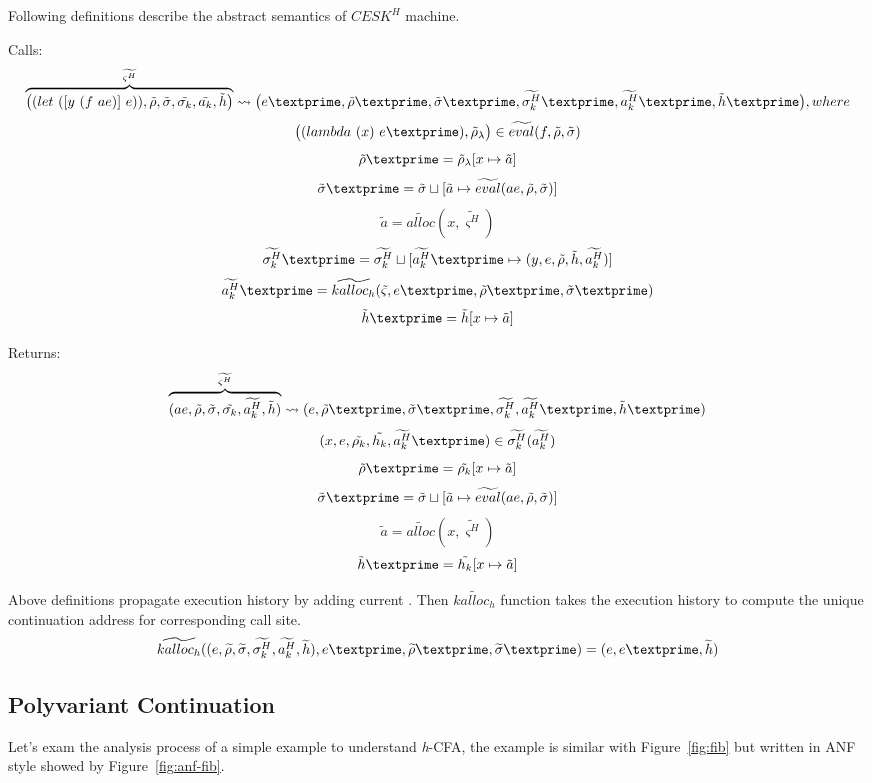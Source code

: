 \documentclass{article}
\begin{document}
Following definitions describe the abstract semantics of $CESK^H$ machine.

Calls:
\[
\overbrace{
\big((let\ ([y\ (f\ ae)]\ e)), \tilde{\rho}, \tilde{\sigma}, \tilde{\sigma_k}, \tilde{a_k}, \tilde{h} \big)
}^{\widetilde{\varsigma^H}}
\leadsto \big(e\textprime,\tilde{\rho}\textprime, \tilde{\sigma}\textprime, \widetilde{\sigma_k^H}\textprime, \widetilde{a_k^H}\textprime, \tilde{h}\textprime \big), where
\]
\[
\big((lambda\ (x)\ e\textprime), \tilde{\rho}_{\lambda}  \big) \in \widetilde{eval}(f, \tilde{\rho}, \tilde{\sigma})
\]
\[
\tilde{\rho}\textprime = \tilde{\rho}_{\lambda}[x \mapsto \tilde{a}]
\]
\[
\tilde{\sigma}\textprime = \tilde{\sigma} \sqcup [\tilde{a} \mapsto \widetilde{eval}(ae, \tilde{\rho}, \tilde{\sigma})]
\]
\[
\tilde{a} = \widetilde{alloc}(x, \widetilde{\varsigma^H})
\]
\[
\widetilde{\sigma_k^H}\textprime = \widetilde{\sigma_k^H} \sqcup [\widetilde{a_k^H}\textprime \mapsto {(y, e, \tilde{\rho}, \tilde{h}, \widetilde{a_k^H})}]
\]
\[
\widetilde{a_k^H}\textprime = \widetilde{kalloc_h}(\tilde{\varsigma}, e\textprime, \tilde{\rho}\textprime, \tilde{\sigma}\textprime)
\]
\[
\tilde{h}\textprime = \tilde{h}[x \mapsto \tilde{a}]
\]

Returns:
\[
\overbrace{
(ae, \tilde{\rho}, \tilde{\sigma}, \tilde{\sigma_k}, \widetilde{a_k^H}, \tilde{h})
}^{\widetilde{\varsigma^H}}
\leadsto (e, \tilde{\rho}\textprime, \tilde{\sigma}\textprime, \widetilde{\sigma_k^H}, \widetilde{a_k^H}\textprime, \tilde{h}\textprime)
\]
\[
(x, e, \tilde{\rho_k}, \tilde{h_k}, \widetilde{a_k^H}\textprime) \in \widetilde{\sigma_k^H}(\widetilde{a_k^H})
\]
\[
\tilde{\rho}\textprime = \tilde{\rho_k}[x \mapsto \tilde{a}]
\]
\[
\tilde{\sigma}\textprime = \tilde{\sigma} \sqcup [\tilde{a} \mapsto \widetilde{eval}(ae, \tilde{\rho}, \tilde{\sigma})]
\]
\[
\tilde{a} = \widetilde{alloc}(x, \widetilde{\varsigma^H})
\]
\[
\tilde{h}\textprime = \tilde{h_k}[x \mapsto \tilde{a}]
\]

Above definitions propagate execution history by adding current . Then $\widetilde{kalloc_h}$ function takes the execution history to compute the unique continuation address for corresponding call site.
\[
\widetilde{kalloc_h} ((e, \widetilde{\rho}, \widetilde{\sigma}, \widetilde{\sigma_k^H}, \widetilde{a_k^H}, \widetilde{h}), e\textprime, \widetilde{\rho}\textprime, \widetilde{\sigma}\textprime) =
(e, e\textprime, \widetilde{h})
\]

\subsection{Polyvariant Continuation}
\label{sub:Polyvariant Continuation}
Let's exam the analysis process of a simple example to understand \textit{h}-CFA, the example is similar with Figure~\ref{fig:fib} but written in ANF style showed by Figure~\ref{fig:anf-fib}.
\end{document}
